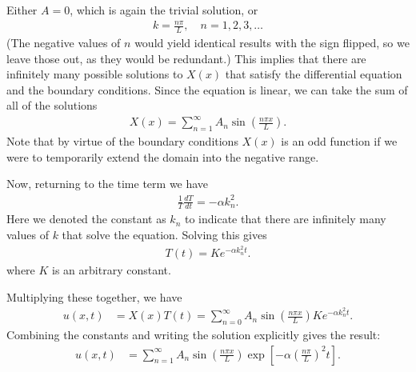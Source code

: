 Either $A = 0$, which is again the trivial solution, or 
\begin{align}
  k = \frac{n\pi}{L}, \quad n = 1, 2, 3, \ldots
\end{align}
(The negative values of $n$ would yield identical results with the sign flipped, so we leave those out, as they would be redundant.) This implies that there are infinitely many possible solutions to $X(x)$ that satisfy the differential equation and the boundary conditions. Since the equation is linear, we can take the sum of all of the solutions
\begin{align}
  X(x) = \sum_{n=1}^\infty A_n \sin \left( \frac{ n \pi x }{ L } \right) .
\end{align}
Note that by virtue of the boundary conditions $X(x)$ is an odd function if we were to temporarily extend the domain into the negative range.

Now, returning to the time term we have
\begin{align}
  \frac{1}{T} \frac{dT}{dt} = -\alpha k_n^2 .
\end{align}
Here we denoted the constant as $k_n$ to indicate that there are infinitely many values of $k$ that solve the equation. Solving this gives
\begin{align}
  T(t) = K e^{-\alpha k_n^2 t}.
\end{align}
where $K$ is an arbitrary constant.

Multiplying these together, we have 
\begin{align}
  u(x,t) &= X(x) T(t) =  \sum_{n=0}^\infty A_n \sin \left( \frac{ n \pi x }{ L } \right)  K e^{-\alpha k_n^2 t} . \nonumber 
\end{align}
Combining the constants and writing the solution explicitly gives the result:
\begin{align}
  u(x,t) &= \sum_{n=1}^\infty A_n \sin \left( \frac{ n \pi x }{ L } \right)  \exp \left[ -\alpha \left( \frac{ n \pi }{ L } \right)^2 t \right] .
\end{align}

